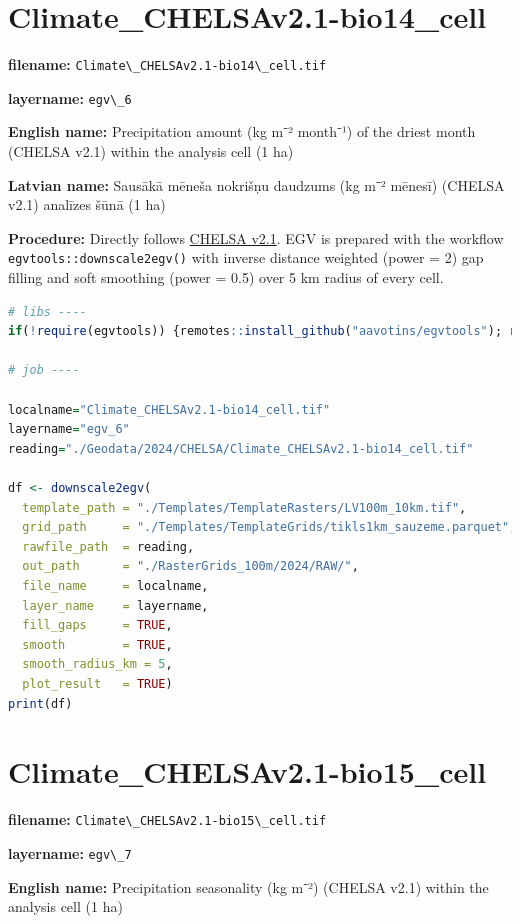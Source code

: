 \documentclass[
]{book}
\newcommand{\passthrough}[1]{#1}
\begin{document}
\section{Climate\_CHELSAv2.1-bio14\_cell}\label{ch06.006}

\textbf{filename:} \passthrough{\lstinline!Climate\_CHELSAv2.1-bio14\_cell.tif!}

\textbf{layername:} \passthrough{\lstinline!egv\_6!}

\textbf{English name:} Precipitation amount (kg m⁻² month⁻¹) of the driest month (CHELSA v2.1) within the analysis cell (1 ha)

\textbf{Latvian name:} Sausākā mēneša nokrišņu daudzums (kg m⁻² mēnesī) (CHELSA v2.1) analīzes šūnā (1 ha)

\textbf{Procedure:} Directly follows \hyperref[Ch04.11]{CHELSA v2.1}. EGV is prepared with the
workflow \passthrough{\lstinline!egvtools::downscale2egv()!} with inverse distance weighted (power = 2)
gap filling and soft smoothing (power = 0.5) over 5 km radius of every cell.

\begin{lstlisting}[language=R]
# libs ----
if(!require(egvtools)) {remotes::install_github("aavotins/egvtools"); require(egvtools)}

# job ----

localname="Climate_CHELSAv2.1-bio14_cell.tif"
layername="egv_6"
reading="./Geodata/2024/CHELSA/Climate_CHELSAv2.1-bio14_cell.tif"

df <- downscale2egv(
  template_path = "./Templates/TemplateRasters/LV100m_10km.tif",
  grid_path     = "./Templates/TemplateGrids/tikls1km_sauzeme.parquet",
  rawfile_path  = reading,
  out_path      = "./RasterGrids_100m/2024/RAW/",
  file_name     = localname,
  layer_name    = layername,
  fill_gaps     = TRUE,
  smooth        = TRUE,
  smooth_radius_km = 5,
  plot_result   = TRUE)
print(df)
\end{lstlisting}

\section{Climate\_CHELSAv2.1-bio15\_cell}\label{ch06.007}

\textbf{filename:} \passthrough{\lstinline!Climate\_CHELSAv2.1-bio15\_cell.tif!}

\textbf{layername:} \passthrough{\lstinline!egv\_7!}

\textbf{English name:} Precipitation seasonality (kg m⁻²) (CHELSA v2.1) within the analysis cell (1 ha)
\end{document}
